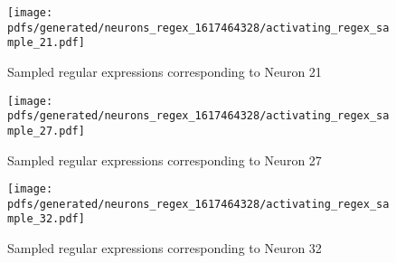 \newpage

\begin{figure}[t!]
  \centering
  \texttt{[image: pdfs/generated/neurons\_regex\_1617464328/activating\_regex\_sample\_21.pdf]}
  \caption{Sampled regular expressions corresponding to Neuron 21}
  \label{fig:regex_example_neuron_21}
\end{figure}

\begin{figure}[t!]
  \centering
  \texttt{[image: pdfs/generated/neurons\_regex\_1617464328/activating\_regex\_sample\_27.pdf]}
  \caption{Sampled regular expressions corresponding to Neuron 27}
  \label{fig:regex_example_neuron_27}
\end{figure}

\begin{figure}[t!]
  \centering
  \texttt{[image: pdfs/generated/neurons\_regex\_1617464328/activating\_regex\_sample\_32.pdf]}
  \caption{Sampled regular expressions corresponding to Neuron 32}
  \label{fig:regex_example_neuron_32}
\end{figure}

\clearpage


